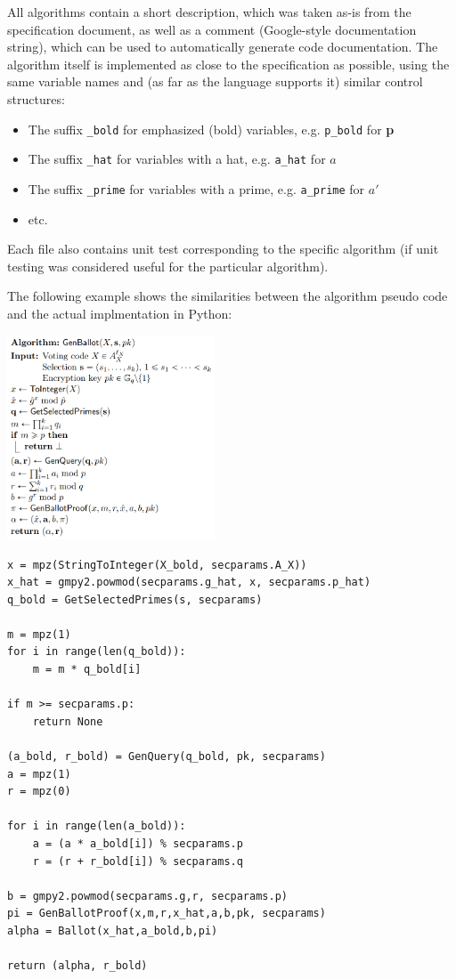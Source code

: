 All algorithms contain a short description, which was taken as-is from the specification document, as well as a comment (Google-style documentation string), which can be used to automatically generate code documentation. The algorithm itself is implemented as close to the specification as possible, using the same variable names and (as far as the language supports it) similar control structures:

\begin{itemize}
	\item The suffix \texttt{\_bold} for emphasized (bold) variables, e.g. \texttt{p\_bold} for \textbf{p}
	\item The suffix \texttt{\_hat} for variables with a hat, e.g. \texttt{a\_hat} for $\hat{a}$
	\item The suffix \texttt{\_prime} for variables with a prime, e.g. \texttt{a\_prime} for $a'$
	\item etc.
\end{itemize}

Each file also contains unit test corresponding to the specific algorithm (if unit testing was considered useful for the particular algorithm).

The following example shows the similarities between the algorithm pseudo code and the actual implmentation in Python:

\begin{multicols}{2}
\includegraphics[width=0.46\textwidth]{assets/genballot.png}
\columnbreak
\begin{verbatim}
x = mpz(StringToInteger(X_bold, secparams.A_X))
x_hat = gmpy2.powmod(secparams.g_hat, x, secparams.p_hat)
q_bold = GetSelectedPrimes(s, secparams)

m = mpz(1)
for i in range(len(q_bold)):
    m = m * q_bold[i]

if m >= secparams.p:
    return None

(a_bold, r_bold) = GenQuery(q_bold, pk, secparams)
a = mpz(1)
r = mpz(0)

for i in range(len(a_bold)):
    a = (a * a_bold[i]) % secparams.p
    r = (r + r_bold[i]) % secparams.q

b = gmpy2.powmod(secparams.g,r, secparams.p)
pi = GenBallotProof(x,m,r,x_hat,a,b,pk, secparams)
alpha = Ballot(x_hat,a_bold,b,pi)

return (alpha, r_bold)
\end{verbatim}
\end{multicols}

